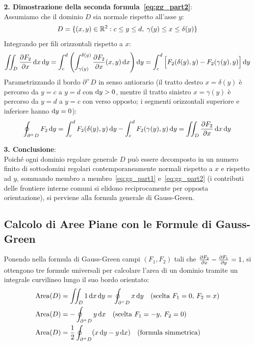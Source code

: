 \begin{dimostrazione}
\medskip\noindent\textbf{2. Dimostrazione della seconda formula~\eqref{eq:gg_part2}}:\\
Assumiamo che il dominio $D$ sia normale rispetto all'asse $y$:
\[
D = \{(x,y) \in \mathbb{R}^2 : c \le y \le d, \; \gamma(y) \le x \le \delta(y)\}
\]
Integrando per fili orizzontali rispetto a $x$:
\[
\iint_D \frac{\partial F_2}{\partial x} \mathop{}\!\mathrm{d} x\mathop{}\!\mathrm{d} y = \int_{c}^{d} \left( \int_{\gamma(y)}^{\delta(y)} \frac{\partial F_2}{\partial x}(x,y) \mathop{}\!\mathrm{d} x \right) \mathop{}\!\mathrm{d} y = \int_{c}^{d} \Big[ F_2(\delta(y), y) - F_2(\gamma(y), y) \Big] \mathop{}\!\mathrm{d} y
\]
Parametrizzando il bordo $\partial^+ D$ in senso antiorario (il tratto destro $x = \delta(y)$ è percorso da $y=c$ a $y=d$ con $\mathop{}\!\mathrm{d} y > 0$, mentre il tratto sinistro $x = \gamma(y)$ è percorso da $y=d$ a $y=c$ con verso opposto; i segmenti orizzontali superiore e inferiore hanno $\mathop{}\!\mathrm{d} y = 0$):
\[
\oint_{\partial^+ D} F_2 \mathop{}\!\mathrm{d} y = \int_{c}^{d} F_2(\delta(y), y) \mathop{}\!\mathrm{d} y - \int_{c}^{d} F_2(\gamma(y), y) \mathop{}\!\mathrm{d} y = \iint_D \frac{\partial F_2}{\partial x} \mathop{}\!\mathrm{d} x\mathop{}\!\mathrm{d} y
\]

\medskip\noindent\textbf{3. Conclusione}:\\
Poiché ogni dominio regolare generale $D$ può essere decomposto in un numero finito di sottodomini regolari contemporaneamente normali rispetto a $x$ e rispetto ad $y$, sommando membro a membro~\eqref{eq:gg_part1} e~\eqref{eq:gg_part2} (i contributi delle frontiere interne comuni si elidono reciprocamente per opposta orientazione), si perviene alla formula generale di Gauss-Green.
\end{dimostrazione}

\subsection{Calcolo di Aree Piane con le Formule di Gauss-Green}

\begin{metodo}
Ponendo nella formula di Gauss-Green campi $(F_1, F_2)$ tali che $\frac{\partial F_2}{\partial x} - \frac{\partial F_1}{\partial y} = 1$, si ottengono tre formule universali per calcolare l'area di un dominio tramite un integrale curvilineo lungo il suo bordo orientato:
\begin{align*}
\operatorname{Area}(D) &= \iint_D 1 \mathop{}\!\mathrm{d} x\mathop{}\!\mathrm{d} y = \oint_{\partial^+ D} x \mathop{}\!\mathrm{d} y \quad (\text{scelta } F_1 = 0, \, F_2 = x) \\
\operatorname{Area}(D) &= -\oint_{\partial^+ D} y \mathop{}\!\mathrm{d} x \quad (\text{scelta } F_1 = -y, \, F_2 = 0) \\
\operatorname{Area}(D) &= \frac{1}{2} \oint_{\partial^+ D} (x \mathop{}\!\mathrm{d} y - y \mathop{}\!\mathrm{d} x) \quad (\text{formula simmetrica})
\end{align*}
\end{metodo}

